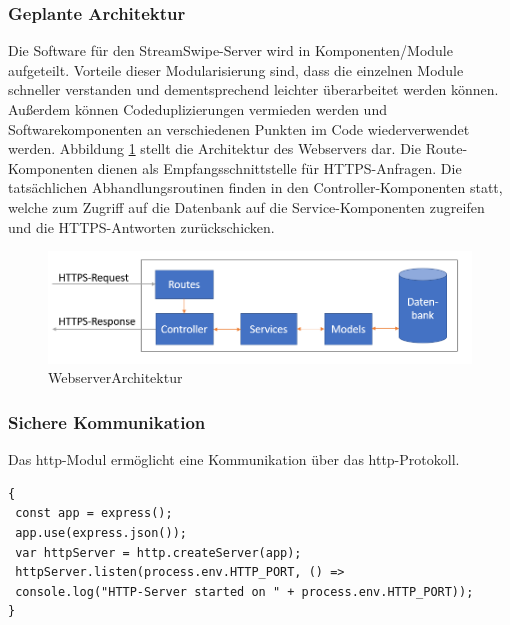 \subsubsection{Geplante Architektur}
Die Software für den StreamSwipe-Server wird in Komponenten/Module aufgeteilt. Vorteile dieser Modularisierung sind, dass die einzelnen Module schneller verstanden und dementsprechend leichter überarbeitet werden können. Außerdem können Codeduplizierungen vermieden werden und Softwarekomponenten an verschiedenen Punkten im Code wiederverwendet werden. Abbildung \ref{fig:WebserverArchitektur} stellt die Architektur des Webservers dar. Die Route-Komponenten dienen als Empfangsschnittstelle für HTTPS-Anfragen. Die tatsächlichen Abhandlungsroutinen finden in den Controller-Komponenten statt, welche zum Zugriff auf die Datenbank auf die Service-Komponenten zugreifen und die HTTPS-Antworten zurückschicken.
\begin{figure}[tbt]
\centering
\includegraphics[width=13cm]{images/backendstruktur.PNG}
\caption{WebserverArchitektur}
\label{fig:WebserverArchitektur}
\end{figure}

\subsubsection{Sichere Kommunikation}
\label{sec:SichereKommunikation}
Das http-Modul ermöglicht eine Kommunikation über das http-Protokoll.\\
 
\begin{lstlisting}[caption=Einfache Verbindung, label=lst:nodejs_easyconnection]
{
 const app = express();
 app.use(express.json()); 
 var httpServer = http.createServer(app);
 httpServer.listen(process.env.HTTP_PORT, () => 
 console.log("HTTP-Server started on " + process.env.HTTP_PORT));
}
\end{lstlisting}

